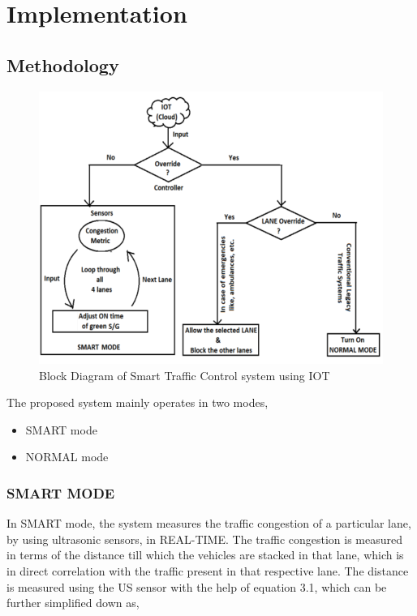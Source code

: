 \chapter{Implementation}
\section{Methodology}

\begin{figure}[h]\centering
\includegraphics[width=5.5in]{./images/SystemDesign.png}
\caption{Block Diagram of Smart Traffic Control system using IOT}\label{SystemDesign}
\end{figure}
The proposed system mainly operates in two modes,
\begin{itemize}
    \item SMART mode
    \item NORMAL mode
\end{itemize}

\pagebreak

\subsection{SMART MODE}
In SMART mode, the system measures the traffic congestion of a particular lane, by using ultrasonic sensors, in REAL-TIME. The traffic congestion is measured in terms of the distance till which the vehicles are stacked in that lane, which is in direct correlation with the traffic present in that respective lane. The distance is measured using the US sensor with the help of equation 3.1, which can be further simplified down as,

